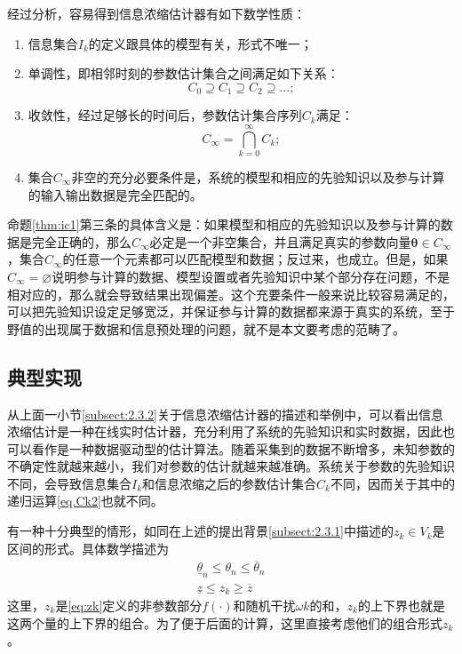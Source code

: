 \begin{prop}%
\label{thm:ic1}
经过分析，容易得到信息浓缩估计器有如下数学性质：
\begin{enumerate}
\item 信息集合$I_{k}$的定义跟具体的模型有关，形式不唯一；
\item 单调性，即相邻时刻的参数估计集合之间满足如下关系：
\begin{equation}%
C_{0}\supseteq C_{1}\supseteq C_{2}\supseteq\ldots;
\end{equation}
\item 收敛性，经过足够长的时间后，参数估计集合序列$C_{k}$满足：
\begin{equation}%
C_{\infty} = \bigcap_{k=0}^{\infty}C_{k};
\end{equation}
\item 集合$C_{\infty}$非空的充分必要条件是，系统的模型和相应的先验知识以及参与计算的输入输出数据是完全匹配的。
\end{enumerate}
\end{prop}

命题\ref{thm:ic1}第三条的具体含义是：如果模型和相应的先验知识以及参与计算的数据是完全正确的，那么$C_{\infty}$必定是一个非空集合，并且满足真实的参数向量$\bm{\theta}\in C_{\infty}$，集合$C_{\infty}$的任意一个元素都可以匹配模型和数据；反过来，也成立。但是，如果$C_{\infty}=\varnothing$说明参与计算的数据、模型设置或者先验知识中某个部分存在问题，不是相对应的，那么就会导致结果出现偏差。这个充要条件一般来说比较容易满足的，可以把先验知识设定足够宽泛，并保证参与计算的数据都来源于真实的系统，至于野值的出现属于数据和信息预处理的问题，就不是本文要考虑的范畴了。
\subsection{典型实现}\label{subsect:2.3.3}
从上面一小节\ref{subsect:2.3.2}关于信息浓缩估计器的描述和举例中，可以看出信息浓缩估计是一种在线实时估计器，充分利用了系统的先验知识和实时数据，因此也可以看作是一种数据驱动型的估计算法。随着采集到的数据不断增多，未知参数的不确定性就越来越小，我们对参数的估计就越来越准确。系统关于参数的先验知识不同，会导致信息集合$I_{k}$和信息浓缩之后的参数估计集合$C_{k}$不同，因而关于其中的递归运算\eqref{eq.Ck2}也就不同。

有一种十分典型的情形，如同在上述的提出背景\ref{subsect:2.3.1}中描述的$z_{k}\in V_{k}$是区间的形式。具体数学描述为
\begin{eqnarray}%
\underline{\theta}_{n}\leq\theta_{n}\leq\overline{\theta}_{n}\\
\underline{z}\leq z_{k}\geq\overline{z}
\end{eqnarray}
这里，$z_{k}$是\eqref{eq:zk}定义的非参数部分$f(\cdot)$和随机干扰$\omega{k}$的和，$z_{k}$的上下界也就是这两个量的上下界的组合。为了便于后面的计算，这里直接考虑他们的组合形式$z_{k}$。

